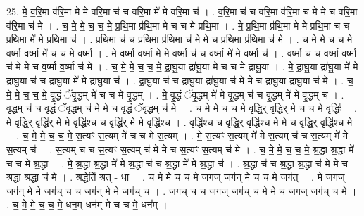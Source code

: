 \documentclass[17pt]{extarticle}
\begin{document}
25. मे॒ व॒रि॒मा व॑रि॒मा मे॑ मे वरि॒मा च॑ च वरि॒मा मे॑ मे वरि॒मा च॑ । . व॒रि॒मा च॑ च वरि॒मा व॑रि॒मा च॑ मे मे च वरि॒मा व॑रि॒मा च॑ मे । . च॒ मे॒ मे॒ च॒ च॒ मे॒ प्र॒थि॒मा प्र॑थि॒मा मे॑ च च मे प्रथि॒मा । . मे॒ प्र॒थि॒मा प्र॑थि॒मा मे॑ मे प्रथि॒मा च॑ च प्रथि॒मा मे॑ मे प्रथि॒मा च॑ । . प्र॒थि॒मा च॑ च प्रथि॒मा प्र॑थि॒मा च॑ मे मे च प्रथि॒मा प्र॑थि॒मा च॑ मे । . च॒ मे॒ मे॒ च॒ च॒ मे॒ व॒र्ष्मा व॒र्ष्मा मे॑ च च मे व॒र्ष्मा । . मे॒ व॒र्ष्मा व॒र्ष्मा मे॑ मे व॒र्ष्मा च॑ च व॒र्ष्मा मे॑ मे व॒र्ष्मा च॑ । . व॒र्ष्मा च॑ च व॒र्ष्मा व॒र्ष्मा च॑ मे मे च व॒र्ष्मा व॒र्ष्मा च॑ मे । . च॒ मे॒ मे॒ च॒ च॒ मे॒ द्रा॒घु॒या द्रा॑घु॒या मे॑ च च मे द्राघु॒या । . मे॒ द्रा॒घु॒या द्रा॑घु॒या मे॑ मे द्राघु॒या च॑ च द्राघु॒या मे॑ मे द्राघु॒या च॑ । . द्रा॒घु॒या च॑ च द्राघु॒या द्रा॑घु॒या च॑ मे मे च द्राघु॒या द्रा॑घु॒या च॑ मे । . च॒ मे॒ मे॒ च॒ च॒ मे॒ वृ॒द्धं ॅवृ॒द्धम् मे॑ च च मे वृ॒द्धम् । . मे॒ वृ॒द्धं ॅवृ॒द्धम् मे॑ मे वृ॒द्धम् च॑ च वृ॒द्धम् मे॑ मे वृ॒द्धम् च॑ । . वृ॒द्धम् च॑ च वृ॒द्धं ॅवृ॒द्धम् च॑ मे मे च वृ॒द्धं ॅवृ॒द्धम् च॑ मे । . च॒ मे॒ मे॒ च॒ च॒ मे॒ वृद्धि॒र् वृद्धि॑र् मे च च मे॒ वृद्धिः॑ । . मे॒ वृद्धि॒र् वृद्धि॑र् मे मे॒ वृद्धि॑श्च च॒ वृद्धि॑र् मे मे॒ वृद्धि॑श्च । . वृद्धि॑श्च च॒ वृद्धि॒र् वृद्धि॑श्च मे मे च॒ वृद्धि॒र् वृद्धि॑श्च मे । . च॒ मे॒ मे॒ च॒ च॒ मे॒ स॒त्यꣳ स॒त्यम् मे॑ च च मे स॒त्यम् । . मे॒ स॒त्यꣳ स॒त्यम् मे॑ मे स॒त्यम् च॑ च स॒त्यम् मे॑ मे स॒त्यम् च॑ । . स॒त्यम् च॑ च स॒त्यꣳ स॒त्यम् च॑ मे मे च स॒त्यꣳ स॒त्यम् च॑ मे । . च॒ मे॒ मे॒ च॒ च॒ मे॒ श्र॒द्धा श्र॒द्धा मे॑ च च मे श्र॒द्धा । . मे॒ श्र॒द्धा श्र॒द्धा मे॑ मे श्र॒द्धा च॑ च श्र॒द्धा मे॑ मे श्र॒द्धा च॑ । . श्र॒द्धा च॑ च श्र॒द्धा श्र॒द्धा च॑ मे मे च श्र॒द्धा श्र॒द्धा च॑ मे । . श्र॒द्धेति॑ श्रत् - धा । . च॒ मे॒ मे॒ च॒ च॒ मे॒ जग॒ज् जग॑न् मे च च मे॒ जग॑त् । . मे॒ जग॒ज् जग॑न् मे मे॒ जग॑च् च च॒ जग॑न् मे मे॒ जग॑च् च । . जग॑च् च च॒ जग॒ज् जग॑च् च मे मे च॒ जग॒ज् जग॑च् च मे । . च॒ मे॒ मे॒ च॒ च॒ मे॒ धन॒म् धन॑म् मे च च मे॒ धन᳚म् । \newline
\pagebreak
{}
\end{document}

